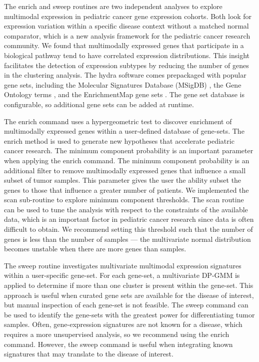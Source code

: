 \documentclass[10pt,letterpaper]{article}
\begin{document}
The enrich and sweep routines are two independent analyses to explore multimodal expression in pediatric cancer gene expression cohorts. Both look for expression variation within a specific disease context without a matched normal comparator, which is a new analysis framework for the pediatric cancer research community. We found that multimodally expressed genes that participate in a biological pathway tend to have correlated expression distributions. This insight facilitates the detection of expression subtypes by reducing the number of genes in the clustering analysis. The hydra software comes prepackaged with popular gene sets, including the Molecular Signatures Database (MSigDB) \cite{liberzonMolecularSignaturesDatabase2011}, the Gene Ontology terms \cite{ashburnerGeneOntologyTool2000, gene2018gene}, and the EnrichmentMap gene sets \cite{merico2010enrichment}. The gene set database is configurable, so additional gene sets can be added at runtime.

The enrich command uses a hypergeometric test \cite{yuClusterProfilerPackageComparing2012} to discover enrichment of multimodally expressed genes within a user-defined database of gene-sets. The enrich method is used to generate new hypotheses that accelerate pediatric cancer research. The minimum component probability is an important parameter when applying the enrich command. The minimum component probability is an additional filter to remove multimodally expressed genes that influence a small subset of tumor samples. This parameter gives the user the ability subset the genes to those that influence a greater number of patients. We implemented the scan sub-routine to explore minimum component thresholds. The scan routine can be used to tune the analysis with respect to the constraints of the available data, which is an important factor in pediatric cancer research since data is often difficult to obtain. We recommend setting this threshold such that the number of genes is less than the number of samples --- the multivariate normal distribution becomes unstable when there are more genes than samples.

The sweep routine investigates multivariate multimodal expression signatures within a user-specific gene-set. For each gene-set, a multivariate DP-GMM is applied to determine if more than one cluster is present within the gene-set. This approach is useful when curated gene sets are available for the disease of interest, but manual inspection of each gene-set is not feasible. The sweep command can be used to identify the gene-sets with the greatest power for differentiating tumor samples. Often, gene-expression signatures are not known for a disease, which requires a more unsupervised analysis, so we recommend using the enrich command. However, the sweep command is useful when integrating known signatures that may translate to the disease of interest.
\end{document}
